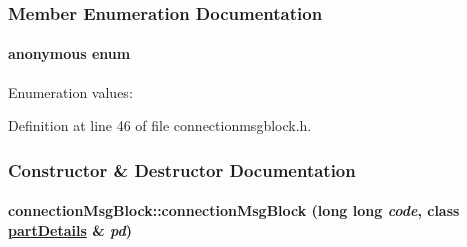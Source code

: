 \subsubsection{Member Enumeration Documentation}
\hypertarget{classconnectionMsgBlock_connectionMsgBlocks3}{
\paragraph["@0]{\setlength{\rightskip}{0pt plus 5cm}anonymous enum}\hfill}
\label{classconnectionMsgBlock_connectionMsgBlocks3}


\begin{Desc}
\item[Enumeration values: ]\par
\begin{description}
\item[{\em 
\hypertarget{classconnectionMsgBlock_connectionMsgBlocks3connectionMsgBlocks0}{
{\em DATASIZE}}
\label{classconnectionMsgBlock_connectionMsgBlocks3connectionMsgBlocks0}
}]\item[{\em 
\hypertarget{classconnectionMsgBlock_connectionMsgBlocks3connectionMsgBlocks1}{
{\em DATA\_\-WO\_\-CRC}}
\label{classconnectionMsgBlock_connectionMsgBlocks3connectionMsgBlocks1}
}]\item[{\em 
\hypertarget{classconnectionMsgBlock_connectionMsgBlocks3connectionMsgBlocks2}{
{\em CRC\_\-OFFSET}}
\label{classconnectionMsgBlock_connectionMsgBlocks3connectionMsgBlocks2}
}]\end{description}
\end{Desc}



Definition at line 46 of file connectionmsgblock.h.

\subsubsection{Constructor \& Destructor Documentation}
\hypertarget{classconnectionMsgBlock_connectionMsgBlocka0}{
\paragraph[connectionMsgBlock]{\setlength{\rightskip}{0pt plus 5cm}connection\-Msg\-Block::connection\-Msg\-Block (long long {\em code}, class \hyperlink{classpartDetails}{part\-Details} \& {\em pd})}\hfill}
\label{classconnectionMsgBlock_connectionMsgBlocka0}


